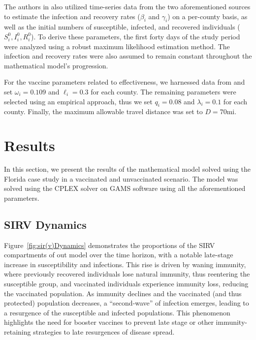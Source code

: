 \documentclass{article}
\begin{document}
The authors in \textcite{abazari2024allocation} also utilized time-series data from the two aforementioned sources to estimate the infection and recovery rates ($\beta_i$ and $\gamma_i$) on a per-county basis, as well as the initial numbers of susceptible, infected, and recovered individuals ($S_i^0, I_i^0, R_i^0$). To derive these parameters, the first forty days of the study period were analyzed using a robust maximum likelihood estimation method. The infection and recovery rates were also assumed to remain constant throughout the mathematical model's progression.

For the vaccine parameters related to effectiveness, we harnessed data from \textcite{zheng2022real} and set $\omega_i = 0.109$ and $\ell_i = 0.3$ for each county. The remaining parameters were selected using an empirical approach, thus we set $q_i = 0.08$ and $\lambda_i = 0.1$ for each county. Finally, the maximum allowable travel distance was set to $D=70$mi.



\section{Results}
In this section, we present the results of the mathematical model solved using the Florida case study in a vaccinated and unvaccinated scenario. The model was solved using the CPLEX solver on GAMS software using all the aforementioned parameters. 

\subsection{SIRV Dynamics}
Figure~\ref{fig:sir(v)Dynamics} demonstrates the proportions of the SIRV compartments of out model over the time horizon, with a notable late-stage increase in susceptibility and infections. This rise is driven by waning immunity, where previously recovered individuals lose natural immunity, thus reentering the susceptible group, and vaccinated individuals experience immunity loss, reducing the vaccinated population. As immunity declines and the vaccinated (and thus protected) population decreases, a ``second-wave'' of infection emerges, leading to a resurgence of the susceptible and infected populations. This phenomenon highlights the need for booster vaccines to prevent late stage or other immunity-retaining strategies to late resurgences of disease spread.
\end{document}
